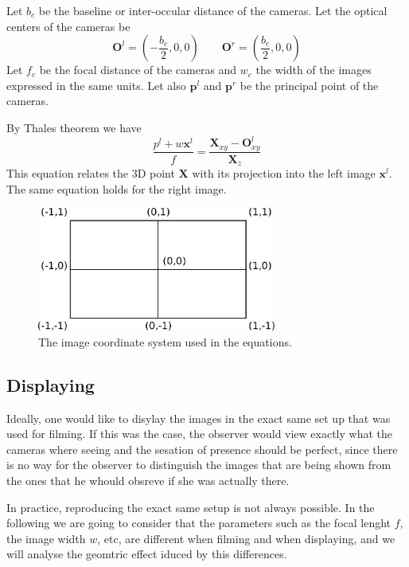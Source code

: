 \documentclass[12pt,a4paper]{article}
\def\x{\mathbf x}
\def\X{\mathbf X}
\def\O{\mathbf O}
\def\p{\mathbf p}
\begin{document}
Let $b_c$ be the baseline or inter-occular distance of the cameras.  Let the optical centers of the cameras be
\begin{equation}
 \O^l = (-\frac{b_c}{2}, 0, 0)  \quad\quad  \O^r = (\frac{b_c}{2}, 0, 0)
\end{equation}
Let $f_c$ be the focal distance of the cameras and $w_c$ the width of the images expressed in the same units.  Let also $\p^l$ and $\p^r$ be the principal point of the cameras.


By Thales theorem we have
\begin{equation}
 \frac{p^l + w \x^l}{f} = \frac{\X_{xy} - \O^l_{xy}}{\X_z}
\end{equation}
This equation relates the 3D point $\X$ with its projection into the left image $\x^l$.  The same equation holds for the right image.


\begin{figure}
 \begin{center}
  \includegraphics[width=0.7\textwidth]{image_coordinate.pdf}
 \end{center}
 \caption{The image coordinate system used in the equations.}
\end{figure}

\subsection{Displaying}
Ideally, one would like to disylay the images in the exact same set up that was used for filming.  If this was the case, the observer would view exactly what the cameras where seeing and the sesation of presence should be perfect, since there is no way for the observer to distinguish the images that are being shown from the ones that he whould obsreve if she was actually there.

In practice, reproducing the exact same setup is not always possible.  In the following we are going to consider that the parameters such as the focal lenght $f$, the image width $w$, etc, are different when filming and when displaying, and we will analyse the geomtric effect iduced by this differences.
\end{document}
